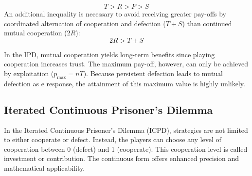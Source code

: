 \documentclass[11pt]{article}
\begin{document}
\begin{equation}
T > R > P > S
\end{equation}
An additional inequality is necessary to avoid receiving greater pay-offs by coordinated alternation of cooperation and defection ($T + S$) than continued mutual cooperation ($2 R$):
\begin{equation}\label{eq:AvGrPa}
2R > T + S
\end{equation}

In the IPD, mutual cooperation yields long-term benefits since playing cooperation increases trust.
The maximum pay-off, however, can only be achieved by exploitation ($p_{\mathrm{max}} = n T$).
Because persistent defection leads to mutual defection as e response, the attainment of this maximum value is highly unlikely.

%
\subsection{Iterated Continuous Prisoner's Dilemma} \label{sec:iterated_continuous_prisoners_dilemma}

In the Iterated Continuous Prisoner's Dilemma (ICPD), strategies are not limited to either cooperate or defect.
Instead, the players can choose any level of cooperation between 0 (defect) and 1 (cooperate).
This cooperation level is called investment or contribution.
The continuous form offers enhanced precision and mathematical applicability.
%
\end{document}
